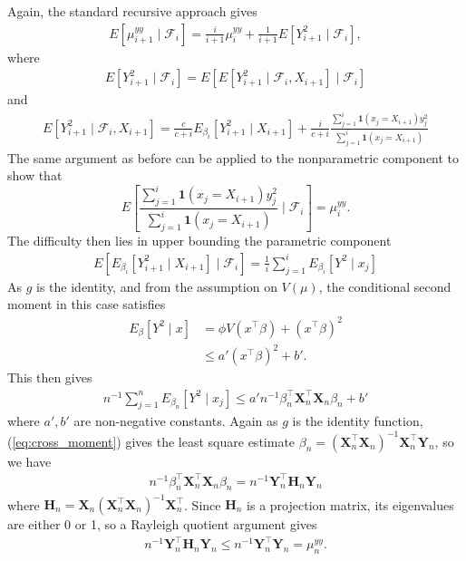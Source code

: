 \documentclass[11pt,a4paper]{article}
\theoremstyle{plain}
\theoremstyle{remark}
\theoremstyle{remark}
\begin{document}
Again, the standard recursive approach gives
\begin{align*}
    E\left[\mu_{i+1}^{yy} \mid \mathcal{F}_{i}\right] = \frac{i}{i+1} \mu_{i}^{yy} + \frac{1}{i+1}E\left[Y_{i+1}^2 \mid \mathcal{F}_i\right],
\end{align*}
where
\begin{align*}
    E\left[Y_{i+1}^2 \mid \mathcal{F}_i\right] = E\left[E\left[Y_{i+1}^2 \mid \mathcal{F}_i,X_{i+1}\right] \mid \mathcal{F}_i\right]
\end{align*}
and
\begin{align*}
    E\left[Y_{i+1}^2 \mid \mathcal{F}_i,X_{i+1}\right] = \frac{c}{c+i} E_{\beta_i}\left[Y_{i+1}^2 \mid X_{i+1}\right] +\frac{i}{c+i} \frac{\sum_{j = 1}^i \mathbf{1}\left(x_j = X_{i+1} \right) y_j^2}{\sum_{j = 1}^i \mathbf{1}\left(x_j = X_{i+1}\right)} 
\end{align*}
The same argument as before can be applied to the nonparametric component to show that
$$
E\left[\frac{\sum_{j = 1}^i \mathbf{1}\left(x_j = X_{i+1} \right) y_j^2}{\sum_{j = 1}^i \mathbf{1}\left(x_j = X_{i+1}\right)}\mid \mathcal{F}_i\right] = \mu_i^{yy}. 
 $$
The difficulty then lies in upper bounding the parametric component
\begin{align*}
E\left[E_{\beta_i}\left[Y_{i+1}^2 \mid X_{i+1}\right] \mid \mathcal{F}_i\right] = \frac{1}{i}\sum_{j = 1}^i E_{\beta_i}\left[Y^2 \mid  x_j\right]
\end{align*}
As $g$ is the identity, and from the assumption on $V(\mu)$, the conditional second moment in this case satisfies
    \begin{align*}
    E_{\beta}[Y^2 \mid x] &= \phi V(x^\top \beta) + (x^\top \beta)^2\\
    &\leq a'(x^\top \beta)^2 + b'.
    \end{align*}
     This then gives
    \begin{align*}
         n^{-1}\sum_{j = 1}^n E_{\beta_n}\left[Y^2 \mid  x_j\right] \leq  a'n^{-1} \beta_n^\top \mathbf{X}_n^\top \mathbf{X}_n\beta_n + b'
    \end{align*}
    where $a',b'$ are non-negative constants. Again as $g$ is the identity function, (\ref{eq:cross_moment}) gives the least square estimate 
    $\beta_n = \left(\mathbf{X}_n^\top \mathbf{X}_n\right)^{-1}\mathbf{X}_n^\top \mathbf{Y}_n$, so we have
    \begin{align*}
        n^{-1} \beta_n^\top \mathbf{X}_n^\top \mathbf{X}_n\beta_n = n^{-1}\mathbf{Y}_n^\top \mathbf{H}_n \mathbf{Y}_n
    \end{align*}
    where $\mathbf{H}_n = \mathbf{X}_n \left(\mathbf{X}_n^\top \mathbf{X}_n\right)^{-1}\mathbf{X}_n^\top$. Since $\mathbf{H}_n$ is a projection matrix, its eigenvalues are either 0 or 1, so a Rayleigh quotient argument gives
    \begin{align*}
        n^{-1}\mathbf{Y}_n^\top \mathbf{H}_n \mathbf{Y}_n \leq  n^{-1}\mathbf{Y}_n^\top \mathbf{Y}_n  = \mu_n^{yy}.
    \end{align*}
\end{document}
